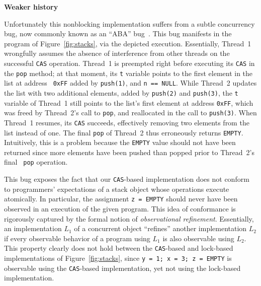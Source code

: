 \begin{figure*}[t]
%    
  \begin{minipage}[t]{43mm}
{\normalsize \textbf{Weaker history}} \\[1em]
    
    \vspace{1cm}
  \end{minipage}
  \caption{Two implementations of a concurrent stack object, a stack-using
  program, and an execution using Treiber's stack. The {\tt pop} operation
  returns the {\tt EMPTY} when the stack is empty. The execution depicts calls,
  returns, and assignments, and time progresses downward.}
  \label{fig:stacks}
\end{figure*}

Unfortunately this nonblocking implementation suffers from a subtle concurrency
bug, now commonly known as an ``ABA'' bug~\cite{tr/ibm/Michael04}. This bug
manifests in the program of Figure~\ref{fig:stacks}, via the depicted
execution. Essentially, Thread~1 wrongfully assumes the absence of interference
from other threads on the successful {\tt CAS} operation. Thread~1 is preempted
right before executing its {\tt CAS} in the {\tt pop} method; at that moment,
its {\tt t} variable points to the first element in the list at address {\tt
0xFF} added by {\tt push(1)}, and {\tt n == NULL}. While Thread~2 updates the
list with two additional elements, added by {\tt push(2)} and {\tt push(3)},
the {\tt t} variable of Thread~1 still points to the list's first element at
address {\tt 0xFF}, which was freed by Thread~2's call to {\tt pop}, and
reallocated in the call to {\tt push(3)}. When Thread~1 resumes, its {\tt CAS}
succeeds, effectively removing two elements from the list instead of one. The
final {\tt pop} of Thread~2 thus erroneously returns {\tt EMPTY}. Intuitively,
this is a problem because the {\tt EMPTY} value should not have been returned
since more elements have been pushed than popped prior to Thread~2's final {\tt
pop} operation.

This bug exposes the fact that our {\tt CAS}-based implementation does not
conform to programmers' expectations of a stack object whose operations execute
atomically. In particular, the assignment {\tt z = EMPTY} should never have
been observed in an execution of the given program. This idea of conformance is
rigorously captured by the formal notion of \emph{observational refinement}.
Essentially, an implementation $L_1$ of a concurrent object ``refines'' another
implementation $L_2$ if every observable behavior of a program using $L_1$ is
also observable using $L_2$. This property clearly does not hold between the
{\tt CAS}-based and lock-based implementations of Figure~\ref{fig:stacks},
since {\tt y = 1; x = 3; z = EMPTY} is observable using the {\tt CAS}-based
implementation, yet not using the lock-based implementation.
